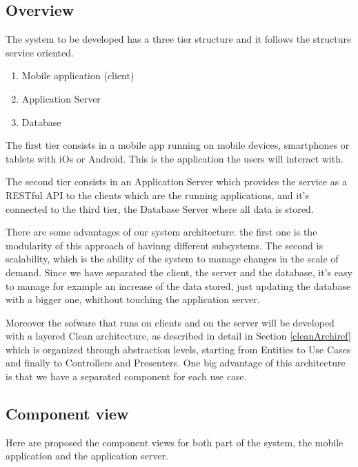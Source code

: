 \subsection{Overview}
The system to be developed has a three tier structure and it follows the structure service oriented.
\begin{enumerate}
  \item Mobile application (client)
  \item Application Server
  \item Database
\end{enumerate}

The first tier consists in a mobile app running on mobile devices, smartphones or tablets with iOs or Android.
This is the application the users will interact with.

The second tier consists in an Application Server which provides the service as a RESTful API to the clients which are the running applications, and it's connected to the third tier, the Database Server where all data is stored.

There are some advantages of our system architecture: the first one is the modularity of this approach of havinng different subsystems. The second is scalability,  which is the ability of the system to manage changes in the scale of demand. Since we have separated the client, the server and the database, it's easy to manage for example an increase of the data stored, just updating the database with a bigger one, whithout touching the application server.

Moreover the sofware that runs on clients and on the server will be developed with a layered Clean architecture, as described in detail in Section \ref{cleanArchiref} which is organized through abstraction levels, starting from Entities to Use Cases and finally to Controllers and Presenters.
One big advantage of this architecture is that we have a separated component for each use case.

\subsection{Component view}
Here are proposed the component views for both part of the system, the mobile application and the application server.

